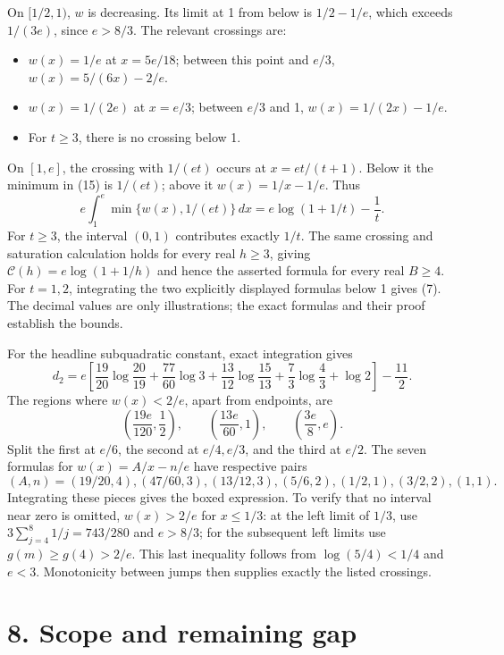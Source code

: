 \documentclass[11pt]{article}
\begin{document}
On \([1/2,1)\), \(w\) is decreasing. Its limit at 1 from below is \(1/2-1/e\), which exceeds \(1/(3e)\), since \(e>8/3\). The relevant crossings are:

\begin{itemize}
\item \(w(x)=1/e\) at \(x=5e/18\); between this point and \(e/3\), \(w(x)=5/(6x)-2/e\).
\item \(w(x)=1/(2e)\) at \(x=e/3\); between \(e/3\) and 1, \(w(x)=1/(2x)-1/e\).
\item For \(t\ge3\), there is no crossing below 1.

\end{itemize}
On \([1,e]\), the crossing with \(1/(et)\) occurs at \(x=et/(t+1)\). Below it the minimum in (15) is \(1/(et)\); above it \(w(x)=1/x-1/e\). Thus
\[
e\int_1^e\min\{w(x),1/(et)\}\,dx
=e\log(1+1/t)-\frac1t. \tag{16}
\]
For \(t\ge3\), the interval \((0,1)\) contributes exactly \(1/t\). The same crossing and saturation calculation holds for every real \(h\ge3\), giving \(\mathcal C(h)=e\log(1+1/h)\) and hence the asserted formula for every real \(B\ge4\). For \(t=1,2\), integrating the two explicitly displayed formulas below 1 gives (7). The decimal values are only illustrations; the exact formulas and their proof establish the bounds.

For the headline subquadratic constant, exact integration gives
\[
\boxed{
d_2=e\left[
\frac{19}{20}\log\frac{20}{19}
+\frac{77}{60}\log3
+\frac{13}{12}\log\frac{15}{13}
+\frac73\log\frac43+\log2
\right]-\frac{11}{2}.
}
\]
The regions where \(w(x)<2/e\), apart from endpoints, are
\[
\left(\frac{19e}{120},\frac12\right),\qquad
\left(\frac{13e}{60},1\right),\qquad
\left(\frac{3e}{8},e\right).
\]
Split the first at \(e/6\), the second at \(e/4,e/3\), and the third at \(e/2\). The seven formulas for \(w(x)=A/x-n/e\) have respective pairs
\[
(A,n)=
(19/20,4),(47/60,3),(13/12,3),(5/6,2),
(1/2,1),(3/2,2),(1,1).
\]
Integrating these pieces gives the boxed expression. To verify that no interval near zero is omitted, \(w(x)>2/e\) for \(x\le1/3\): at the left limit of \(1/3\), use \(3\sum_{j=4}^8 1/j=743/280\) and \(e>8/3\); for the subsequent left limits use \(g(m)\ge g(4)>2/e\). This last inequality follows from \(\log(5/4)<1/4\) and \(e<3\). Monotonicity between jumps then supplies exactly the listed crossings. 


\section*{8. Scope and remaining gap}
\end{document}
